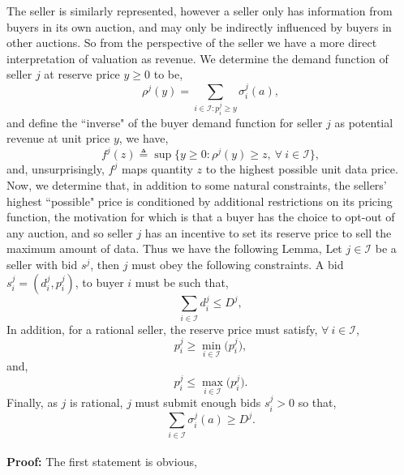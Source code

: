 \documentclass[12pt]{article}
\theoremstyle{definition}
\newcommand{\mcI}{\mathcal{I}}
\newcommand{\g}{\sigma}
\begin{document}
\begin{multicols}{2}
The seller is similarly represented, however a seller only has
information from buyers in its own auction, and may only be indirectly influenced by
buyers in other auctions. So from the perspective of the
seller we have a more direct interpretation of valuation as revenue.
We determine the demand function of seller $j$ at reserve price $y\ge 0$ to be,
\begin{equation}\label{datademand}
    \rho^j(y) = \sum_{i\in\mcI : p_i^j\ge y} \g_i^j(a), 
\end{equation}
and define the ``inverse" of the buyer demand function for seller $j$ as
potential revenue at unit price $y$, we have, 
\begin{equation}\label{sellerinversedemand}
    f^j(z) \triangleq \sup\big\lbrace y\ge 0:
        \rho^j(y) \ge z, \ \forall \ i \in \mcI\big\rbrace,
\end{equation}
and, unsurprisingly, $f^j$ maps quantity $z$ to the highest possible unit data
price. Now, we determine that, in addition to some natural constraints, the sellers' highest
``possible" price is conditioned by
additional restrictions on its pricing function, the motivation for which is
that a buyer has the choice to opt-out of any auction, and so seller $j$ has an
incentive to set its reserve price to sell the maximum amount of
data. Thus we have the following Lemma,
{
\label{sellerconstraints}
Let $j\in\mcI$ be a seller with bid $s^j$, then $j$ must obey the following constraints.
A bid $s_i^j= (d_i^j, p_i^j)$, to buyer $i$ must be such that,
\begin{equation}\label{datacapmax}
    \sum_{i\in\mcI} d^j_i \le D^j,
\end{equation}
In addition, for a rational seller, the reserve price must
satisfy, $\forall \ i\in \mcI$,
\begin{equation}\label{reservepricemin}
   p_i^j \ge \min_{i\in\mcI}\big(p_i^j),
\end{equation}
and,
\begin{equation}\label{reservepricemax}
   p_i^j \le \max_{i\in\mcI}\big(p_i^j).
\end{equation}
Finally, as $j$ is rational, $j$ must submit enough bids $s_i^j >0$ so that,
\begin{equation}\label{datacapmin}
    \displaystyle\sum_{i\in\mcI} \g_i^j(a) \ge D^j.
\end{equation}
}\\
\textbf{Proof:}
The first statement is obvious, 

\end{multicols}
\end{document}

